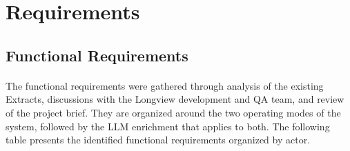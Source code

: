 \section{Requirements}

\subsection{Functional Requirements}

\paragraph{}The functional requirements were gathered through analysis of
the existing Extracts, discussions with the Longview development and QA team,
and review of the project brief. They are organized around the two operating
modes of the system, followed by the LLM enrichment that applies to both.
The following table presents the identified functional requirements
organized by actor.


